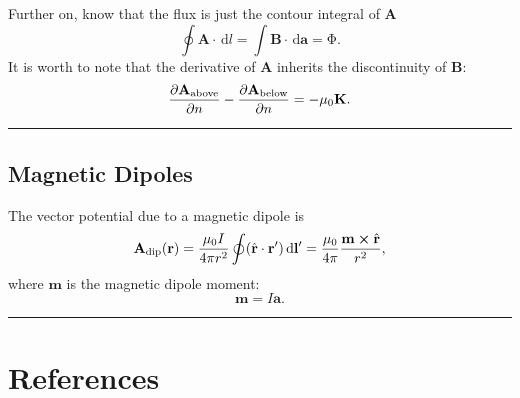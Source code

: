 \documentclass[12pt,english]{article}
\newcommand{\dmr}[1]{\, \mathrm{d}#1} %
\numberwithin{equation}{subsection}
\let\oldhat\hat
\renewcommand{\vec}[1]{\mathbf{#1}}
\renewcommand{\hat}[1]{\oldhat{\mathbf{#1}}}
\begin{document}
Further on, know that the flux is just the contour integral of $\vec{A}$
\begin{equation}
    \oint \vec{A} \cdot \dmr{l} = \int \vec{B} \cdot \dmr{\vec{a}} = \mathrm{\Phi}. 
\end{equation}
It is worth to note that the derivative of $\vec{A}$ inherits the discontinuity of $\vec{B}$:
\begin{equation}
    \pdv{\vec{A}_{\text{above}}}{n} -\pdv{\vec{A}_{\text{below}}}{n} = -\mu_0 \vec{K}.
\end{equation}


\par\noindent\rule{\textwidth}{0.4pt}
\subsection{Magnetic Dipoles}
The vector potential due to a magnetic dipole is 
\begin{equation}
    \vec{A}_{\text{dip}}(\vec{r}) = \frac{\mu_0 I}{4 \pi r^2} \oint (\hat{r}\cdot\vec{r'})\dmr{\vec{l'}}=\frac{\mu_0}{4\pi}\frac{\vec{m}\cross \hat{r}}{r^2},
\end{equation}
where $\vec{m}$ is the magnetic dipole moment:
\begin{equation}
    \vec{m} = I \vec{a}. 
\end{equation}











\par\noindent\rule{\textwidth}{0.4pt}
\newpage
\section*{References}
%
\printbibliography
[heading = none]

\end{document}
